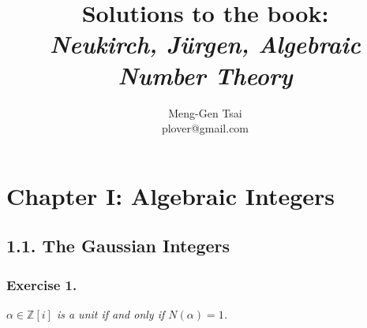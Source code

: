 \documentclass{article}
\title{\textbf{Solutions to the book: \\\emph{Neukirch, J\"{u}rgen, Algebraic Number Theory}}}
\author{Meng-Gen Tsai \\ plover@gmail.com}
\begin{document}
\maketitle
\tableofcontents












\newpage
\section*{Chapter I: Algebraic Integers \\}



\subsection*{1.1. The Gaussian Integers \\}


\subsubsection*{Exercise 1.}
\emph{$\alpha \in \mathbb{Z}[i]$ is a unit if and only if $N(\alpha) = 1$.} \\
\end{document}
